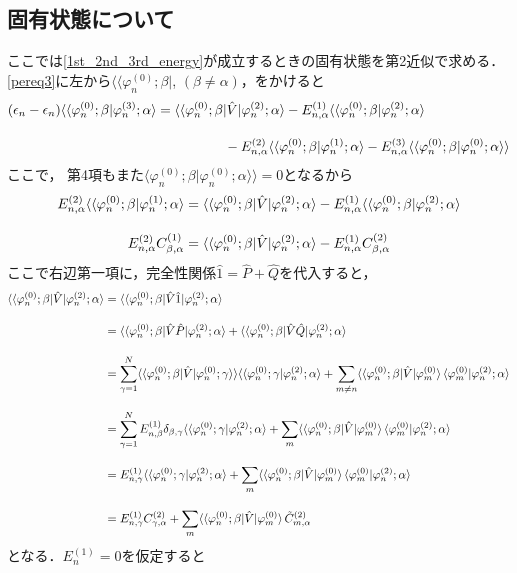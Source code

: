 \subsection{固有状態について}
ここでは\eqref{1st_2nd_3rd_energy}が成立するときの固有状態を第2近似で求める．\eqref{pereq3}に左から$\langle\langle\varphi^{(0)}_{n};\beta|$, $(\beta\neq\alpha)$，をかけると
\begin{align}
    (\epsilon_n-\epsilon_n)\langle\braket{\varphi^{(0)}_{n};\beta|\varphi^{(3)}_n;\alpha}
    &=\langle\braket{\varphi^{(0)}_{n};\beta|\hat{V}|\varphi^{(2)}_n;\alpha}
    -E^{(1)}_{n,\alpha}\langle\braket{\varphi^{(0)}_{n};\beta|\varphi^{(2)}_n;\alpha}\nn[10pt]
    &\hspace{50pt}
    -E^{(2)}_{n,\alpha}\langle\langle\varphi^{(0)}_{n};\beta|\varphi^{(1)}_n;\alpha\rangle
    -E^{(3)}_{n,\alpha}\langle\langle\varphi^{(0)}_{n};\beta|\varphi^{(0)}_n;\alpha\rangle\rangle
\end{align}
ここで，%
第4項もまた$\langle\varphi^{(0)}_{n};\beta|\varphi^{(0)}_n;\alpha\rangle\rangle=0$となるから
\begin{align}
    E^{(2)}_{n,\alpha}\langle\langle\varphi^{(0)}_{n};\beta|\varphi^{(1)}_n;\alpha\rangle
    &=\langle\braket{\varphi^{(0)}_{n};\beta|\hat{V}|\varphi^{(2)}_n;\alpha}
    -E^{(1)}_{n,\alpha}\langle\braket{\varphi^{(0)}_{n};\beta|\varphi^{(2)}_n;\alpha}\\[10pt]
    E^{(2)}_{n,\alpha}C^{(1)}_{\beta,\alpha}
    &=\langle\braket{\varphi^{(0)}_{n};\beta|\hat{V}|\varphi^{(2)}_n;\alpha}
    -E^{(1)}_{n,\alpha}C^{(2)}_{\beta,\alpha}
\end{align}
ここで右辺第一項に，完全性関係$\hat{1}=\hat{P}+\hat{Q}$を代入すると，
\begin{align}
    \langle\braket{\varphi^{(0)}_{n};\beta|\hat{V}|\varphi^{(2)}_n;\alpha}
    &=\langle\braket{\varphi^{(0)}_{n};\beta|\hat{V}\hat{1}|\varphi^{(2)}_n;\alpha}\nn[10pt]
    &=\langle\braket{\varphi^{(0)}_{n};\beta|\hat{V}\hat{P}|\varphi^{(2)}_n;\alpha}
    +\langle\braket{\varphi^{(0)}_{n};\beta|\hat{V}\hat{Q}|\varphi^{(2)}_n;\alpha}\nn[10pt]
    &=\sum_{\gamma=1}^{N}\langle\braket{\varphi^{(0)}_{n};\beta|\hat{V}|\varphi^{(0)}_n;\gamma}\rangle
    \langle\braket{\varphi^{(0)}_{n};\gamma|\varphi^{(2)}_n;\alpha}
    +\sum_{m\neq n}\langle\braket{\varphi^{(0)}_{n};\beta|\hat{V}|\varphi^{(0)}_m}
    \braket{\varphi^{(0)}_{m}|\varphi^{(2)}_n;\alpha}\nn[10pt]
    &=\sum_{\gamma=1}^{N}E^{(1)}_{n,\beta}\delta_{\beta,\gamma}
    \langle\braket{\varphi^{(0)}_{n};\gamma|\varphi^{(2)}_n;\alpha}
    +\sum_{m}\langle\braket{\varphi^{(0)}_{n};\beta|\hat{V}|\varphi^{(0)}_m}
    \braket{\varphi^{(0)}_{m}|\varphi^{(2)}_n;\alpha}\nn[10pt]
    &=E^{(1)}_{n,\gamma}
    \langle\braket{\varphi^{(0)}_{n};\gamma|\varphi^{(2)}_n;\alpha}
    +\sum_{m}\langle\braket{\varphi^{(0)}_{n};\beta|\hat{V}|\varphi^{(0)}_m}
    \braket{\varphi^{(0)}_{m}|\varphi^{(2)}_n;\alpha}\nn[10pt]
    &=E^{(1)}_{n,\gamma}
    C^{(2)}_{\gamma,\alpha}
    +\sum_{m}\langle\braket{\varphi^{(0)}_{n};\beta|\hat{V}|\varphi^{(0)}_m}
    \Tilde{C}^{(2)}_{m,\alpha}
\end{align}
となる．$E^{(1)}_{n}=0$を仮定すると

